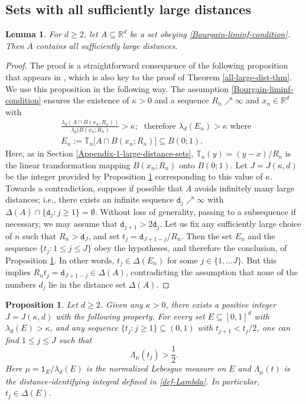 \documentclass[a4paper,11pt]{amsart}
\newtheorem{lem}[thm]{\bf Lemma}
\newtheorem{prop}[thm]{\bf Proposition}
\numberwithin{equation}{section}
\begin{document}
\subsection{Sets with all sufficiently large distances} \label{Appendix-1-Bourgain} 
\begin{lem} 
For $d \geq 2$, let $A \subseteq \mathbb R^d$ be a set obeying \eqref{Bourgain-liminf-condition}. Then $A$ contains all sufficiently large distances. 
\end{lem} 
\begin{proof} 
The proof is a straightforward consequence of the following proposition that appears in \cite{1986Bourgain}, which is also key to the proof of Theorem \ref{all-large-dist-thm}. We use this proposition in the following way. The assumption \eqref{Bourgain-liminf-condition} ensures the existence of $\kappa > 0$ and a sequence $R_n \nearrow \infty$ and $x_n \in \mathbb R^d$ with
\begin{align*} &\frac{\lambda_d(A \cap B(x_n;R_n))}{\lambda_d(B(x_n;R_n)} > \kappa; \;\text{ therefore } \lambda_d(E_n) > \kappa \text{ where } \\ 
&E_n := \mathbb T_{n} \bigl[A \cap B(x_n;R_n) \bigr] \subseteq B(0;1).   
\end{align*}
Here, as in Section \ref{Appendix-1-large-distance-sets}, $\mathbb T_{n} (y) = (y-x)/R_n$ is the linear transformation mapping $B(x_n;R_n)$ onto $B(0;1)$. Let $J=J(\kappa, d)$ be the integer provided by Proposition \ref{Bourgain-prop} corresponding to this value of $\kappa$. 
\vskip0.1in
\noindent Towards a contradiction, suppose if possible that $A$ avoids infinitely many large distances; i.e., there exists an infinite sequence $\mathtt d_j \nearrow \infty$ with $\Delta(A) \cap \bigl\{\mathtt d_j : j \geq 1 \bigr\} = \emptyset$. Without loss of generality, passing to a subsequence if necessary, we may assume that $\mathtt d_{j+1} > 2 \mathtt d_j$. Let us fix any sufficiently large choice of $n$ such that $R_n > \mathtt d_{J}$, and set $t_j = \mathtt d_{J + 1 -j}/R_n$. Then the set $E_n$ and the sequence $\{t_j : 1 \leq j \leq J \}$ obey the hypotheses, and therefore the conclusion, of Proposition \ref{Bourgain-prop}. In other words, $t_j \in \Delta(E_n)$ for some $j \in \{1, \ldots J\}$. But this implies $R_n t_j = \mathtt d_{J+1-j} \in \Delta(A)$, contradicting the assumption that none of the numbers $d_{j}$ lie in the distance set $\Delta(A)$.  
\end{proof} 
\begin{prop}\cite[Proposition 3 and Section 2]{1986Bourgain} \label{Bourgain-prop}
Let $d \geq 2$. Given any $\kappa > 0$, there exists a positive integer $J = J(\kappa, d)$ with the following property. 
\vskip0.1in
\noindent For every set $E \subseteq [0,1]^d$ with $\lambda_d(E) > \kappa$, and any sequence $\{t_j : j \geq 1\} \subseteq (0,1)$ with $t_{j+1} < t_j/2$, one can find $1 \leq j \leq J$ such that 
\[ \Lambda_{\mu}(t_j) > \frac{1}{2}. \]  
Here $\mu = \mathtt 1_E/\lambda_d(E)$ is the normalized Lebesgue measure on $E$ and $\Lambda_{\mu}(t)$ is the distance-identifying integral defined in \eqref{def-Lambda}. In particular, $t_j \in \Delta(E)$. 
\end{prop}
\end{document}
